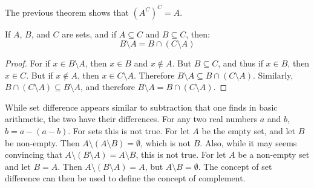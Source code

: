         The previous theorem shows that $(A^C)^{C}=A$.
        \begin{theorem}
            \label{thm:MEASURE_THEORY_SET_DIFFERENCE_AS_INTERSECTION}
            If $A$, $B$, and $C$ are sets, and if $A\subseteq{C}$
            and $B\subseteq{C}$, then:
            \begin{equation}
                B\setminus{A}=B\cap(C\setminus{A})
            \end{equation}
        \end{theorem}
        \begin{proof}
            For if $x\in{B}\setminus{A}$, then
            $x\in{B}$ and $x\notin{A}$. But
            $B\subseteq{C}$, and thus if $x\in{B}$, then $x\in{C}$.
            But if $x\notin{A}$, then $x\in{C}\setminus{A}$. Therefore
            $B\setminus{A}\subseteq{B}\cap(C\setminus{A})$.
            Similarly, $B\cap(C\setminus{A})\subseteq{B}\setminus{A}$,
            and therefore $B\setminus{A}={B}\cap(C\setminus{A})$.
        \end{proof}
        While set difference appears similar to subtraction that one finds in
        basic arithmetic, the two have their differences. For any two real
        numbers $a$ and $b$, $b=a-(a-b)$. For sets this is not true. For let $A$
        be the empty set, and let $B$ be non-empty. Then
        $A\setminus(A\setminus{B})=\emptyset$, which is not $B$.
        Also, while it may seems convincing that
        $A\setminus(B\setminus{A})=A\setminus{B}$, this is not true. For
        let $A$ be a non-empty set and let $B=A$. Then
        $A\setminus(B\setminus{A})=A$, but $A\setminus{B}=\emptyset$.
        The concept of set difference can then be used to define the
        concept of complement.